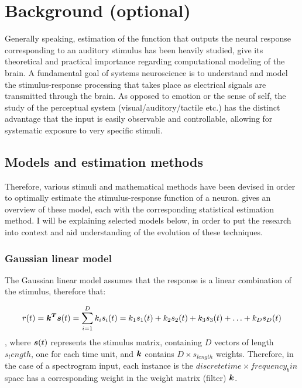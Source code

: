 \chapter{Background (optional)}\label{background}

Generally speaking, estimation of the function that outputs the neural response corresponding to an auditory stimulus has been heavily studied, give its theoretical and practical importance regarding computational modeling of the brain. A fundamental goal of systems neuroscience is to understand and model the stimulus-response processing that takes place as electrical signals are transmitted through the brain. As opposed to emotion or the sense of self, the study of the perceptual system (visual/auditory/tactile etc.) has the distinct advantage that the input is easily observable and controllable, allowing for systematic exposure to very specific stimuli. 

\section{Models and estimation methods}

Therefore, various stimuli and mathematical methods have been devised in order to optimally estimate the stimulus-response function of a neuron. \textcite{meyerModelsNeuronalStimulusResponse2017} gives an overview of these model, each with the corresponding statistical estimation method. I will be explaining selected models below, in order to put the research into context and aid understanding of the evolution of these techniques.

\subsection{Gaussian linear model}

The Gaussian linear model assumes that the response is a linear combination of the stimulus, therefore that:

\begin{equation} \label{LM}
r(t) = \bm{k^{T}}\bm{s}(t) = \sum_{i=1}^D k_i s_i(t) = k_1 s_1(t) + k_2 s_2(t) + k_3 s_3(t) + \ldots + k_D s_D(t)
\end{equation}
, where $\bm{s}(t)$ represents the stimulus matrix, containing $D$ vectors of length $s_length$, one for each time unit, and $\bm{k}$ contains $D \times s_{length}$ weights. Therefore, in the case of a spectrogram input, each instance is the $discrete time \times frequency_bin$ space has a corresponding weight in the weight matrix (filter) $\bm{k}$.

